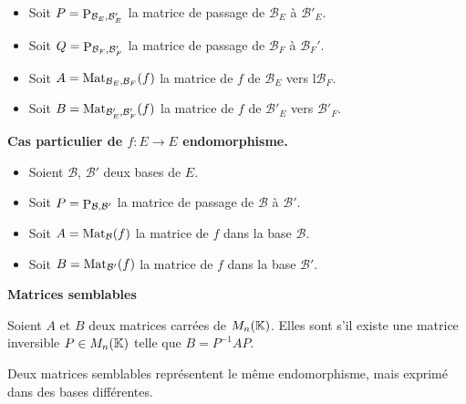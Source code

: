 \documentclass[10pt,class=article,crop=false]{standalone}
\begin{document}
\begin{multicols}{2}
\begin{itemize}
	\item Soit $P = \mathop{\mathrm{P}}\nolimits_{\mathcal{B}_E,\mathcal{B}'_E}$ la matrice de passage de $\mathcal{B}_E$
	à $\mathcal{B}'_E$.
	
	\item Soit $Q = \mathop{\mathrm{P}}\nolimits_{\mathcal{B}_F,\mathcal{B}'_F}$ la matrice de passage de $\mathcal{B}_F$
	à $\mathcal{B}_F'$.
	
	\item Soit $A = \operatorname{Mat}_{\mathcal{B}_E,\mathcal{B}_F} (f)$ la matrice de  $f$ de 
	$\mathcal{B}_E$ vers l$\mathcal{B}_F$.
	
	\item Soit $B = \operatorname{Mat}_{\mathcal{B}'_E,\mathcal{B}'_F} (f)$ la matrice de  $f$ de 	$\mathcal{B}'_E$ vers $\mathcal{B}'_F$.
\end{itemize}


\begin{theoreme}
	\label{th:changementbase}
	\sauteligne
\end{theoreme}


\textbf{Cas particulier de $f : E \to E$ endomorphisme.}
\begin{itemize}
	\item Soient $\mathcal{B}$, $\mathcal{B}'$ deux bases de $E$.
	
	\item Soit $P = \mathop{\mathrm{P}}\nolimits_{\mathcal{B},\mathcal{B}'}$ la matrice de passage de $\mathcal{B}$
	à $\mathcal{B}'$.
	
	\item Soit $A = \operatorname{Mat}_{\mathcal{B}} (f)$ la matrice de $f$ dans la base
	$\mathcal{B}$.
	
	\item Soit $B = \operatorname{Mat}_{\mathcal{B}'} (f)$ la matrice de $f$ dans	la base $\mathcal{B}'$.
\end{itemize}




\textbf{Matrices semblables}

Soient $A$ et $B$ deux matrices carrées de $M_n(\mathbb{K})$.
Elles sont  s'il existe une
matrice inversible $P \in M_n(\mathbb{K})$ telle que
$B=P^{-1}AP$.

\begin{corollaire}
Deux matrices semblables représentent le même endomorphisme, mais exprimé dans des bases différentes.
\end{corollaire}






\end{multicols}
\end{document}
